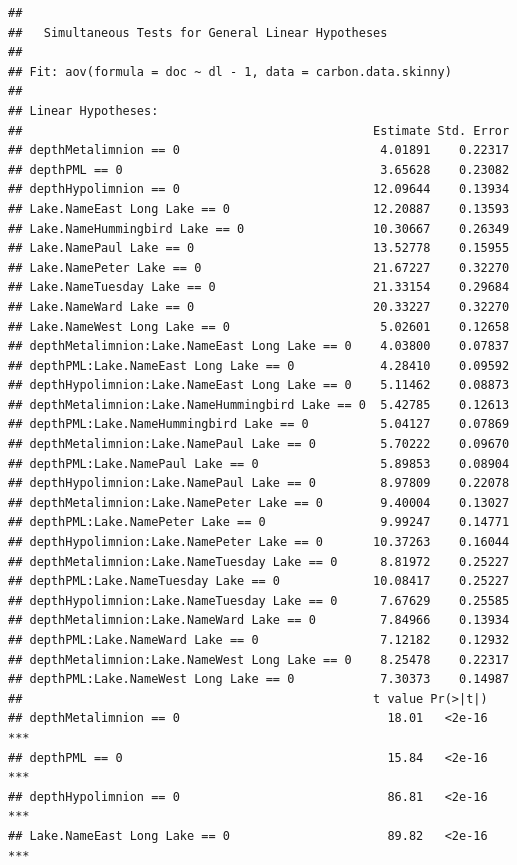\documentclass[12pt,]{article}
\begin{document}
\begin{verbatim}
## 
##   Simultaneous Tests for General Linear Hypotheses
## 
## Fit: aov(formula = doc ~ dl - 1, data = carbon.data.skinny)
## 
## Linear Hypotheses:
##                                                 Estimate Std. Error
## depthMetalimnion == 0                            4.01891    0.22317
## depthPML == 0                                    3.65628    0.23082
## depthHypolimnion == 0                           12.09644    0.13934
## Lake.NameEast Long Lake == 0                    12.20887    0.13593
## Lake.NameHummingbird Lake == 0                  10.30667    0.26349
## Lake.NamePaul Lake == 0                         13.52778    0.15955
## Lake.NamePeter Lake == 0                        21.67227    0.32270
## Lake.NameTuesday Lake == 0                      21.33154    0.29684
## Lake.NameWard Lake == 0                         20.33227    0.32270
## Lake.NameWest Long Lake == 0                     5.02601    0.12658
## depthMetalimnion:Lake.NameEast Long Lake == 0    4.03800    0.07837
## depthPML:Lake.NameEast Long Lake == 0            4.28410    0.09592
## depthHypolimnion:Lake.NameEast Long Lake == 0    5.11462    0.08873
## depthMetalimnion:Lake.NameHummingbird Lake == 0  5.42785    0.12613
## depthPML:Lake.NameHummingbird Lake == 0          5.04127    0.07869
## depthMetalimnion:Lake.NamePaul Lake == 0         5.70222    0.09670
## depthPML:Lake.NamePaul Lake == 0                 5.89853    0.08904
## depthHypolimnion:Lake.NamePaul Lake == 0         8.97809    0.22078
## depthMetalimnion:Lake.NamePeter Lake == 0        9.40004    0.13027
## depthPML:Lake.NamePeter Lake == 0                9.99247    0.14771
## depthHypolimnion:Lake.NamePeter Lake == 0       10.37263    0.16044
## depthMetalimnion:Lake.NameTuesday Lake == 0      8.81972    0.25227
## depthPML:Lake.NameTuesday Lake == 0             10.08417    0.25227
## depthHypolimnion:Lake.NameTuesday Lake == 0      7.67629    0.25585
## depthMetalimnion:Lake.NameWard Lake == 0         7.84966    0.13934
## depthPML:Lake.NameWard Lake == 0                 7.12182    0.12932
## depthMetalimnion:Lake.NameWest Long Lake == 0    8.25478    0.22317
## depthPML:Lake.NameWest Long Lake == 0            7.30373    0.14987
##                                                 t value Pr(>|t|)    
## depthMetalimnion == 0                             18.01   <2e-16 ***
## depthPML == 0                                     15.84   <2e-16 ***
## depthHypolimnion == 0                             86.81   <2e-16 ***
## Lake.NameEast Long Lake == 0                      89.82   <2e-16 ***

\end{verbatim}
\end{document}
